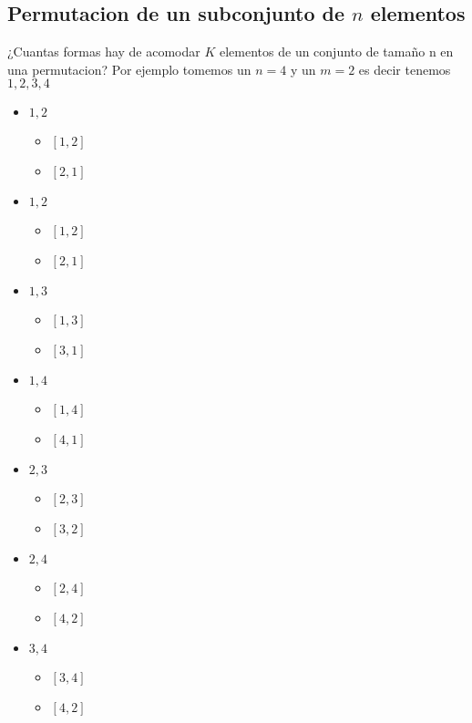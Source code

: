 \subsection{Permutacion de un subconjunto de $n$ elementos}
¿Cuantas formas hay de acomodar $K$ elementos de un conjunto de tamaño n en una permutacion? \newline
Por ejemplo tomemos un $n = 4$ y un $m = 2$ es decir tenemos ${1, 2, 3, 4}$
\begin{itemize}
    \item {${1, 2}$
            \begin{itemize}
                \item {$[1, 2]$}
                \item {$[2, 1]$}
            \end{itemize}
    }
    \item {${1, 2}$
            \begin{itemize}
                \item {$[1, 2]$}
                \item {$[2, 1]$}
            \end{itemize}
    }
    \item {${1, 3}$
            \begin{itemize}
                \item {$[1, 3]$}
                \item {$[3, 1]$}
            \end{itemize}
    }
    \item {${1, 4}$
            \begin{itemize}
                \item {$[1, 4]$}
                \item {$[4, 1]$}
            \end{itemize}
    }
    \item {${2, 3}$
            \begin{itemize}
                \item {$[2, 3]$}
                \item {$[3, 2]$}
            \end{itemize}
    }
    \item {${2, 4}$
            \begin{itemize}
                \item {$[2, 4]$}
                \item {$[4, 2]$}
            \end{itemize}
    }
    \item {${3, 4}$
            \begin{itemize}
                \item {$[3, 4]$}
                \item {$[4, 2]$}
            \end{itemize}
    }
\end{itemize}

